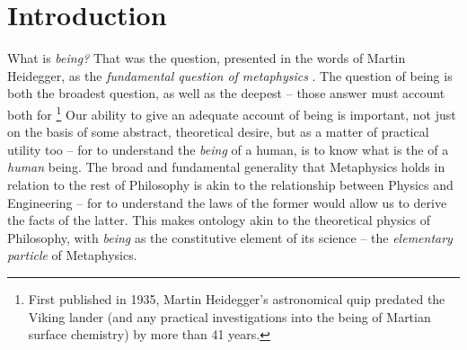 \chapter{Introduction}



What is \emph{being?}  That was the question, presented in the words of Martin Heidegger, as the \emph{fundamental question of metaphysics} \autocite[1]{Heidegger}. The question of being is both the broadest question, as well as the deepest -- those answer must account both for \footnote{First published in 1935, Martin Heidegger's astronomical quip predated the Viking lander (and any practical investigations into the being of Martian surface chemistry) by more than 41 years.} Our ability to give an adequate account of being is important, not just on the basis of some abstract, theoretical desire, but as a matter of practical utility too -- for to understand the \emph{being} of a human, is to know what is the  of a \emph{human} being. The broad and fundamental generality that Metaphysics holds in relation to the rest of Philosophy is akin to the relationship between Physics and Engineering -- for to understand the laws of the former would allow us to derive the facts of the latter. This makes ontology akin to the theoretical physics of Philosophy, with \emph{being} as the constitutive element of its science -- the \emph{elementary particle} of Metaphysics.


